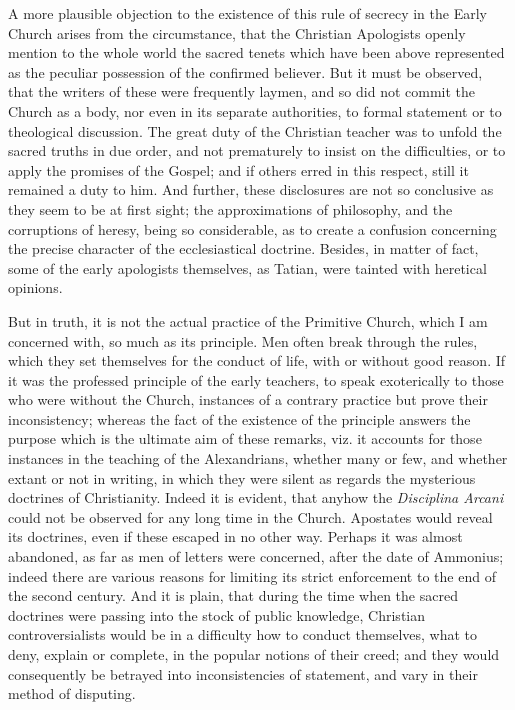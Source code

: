 A more plausible objection to the existence of this rule of secrecy
in the Early Church arises from the circumstance, that the Christian
Apologists openly mention to the whole world the sacred tenets which
have been above represented as the peculiar possession of the
confirmed believer. But it must be observed, that the writers of these
were frequently laymen, and so did not commit the Church as a body,
nor even in its separate authorities, to formal statement or to
theological discussion. The great duty of the Christian teacher was to
unfold the sacred truths in due order, and not prematurely to insist
on the difficulties, or to apply the promises of the Gospel; and if
others erred in this respect, still it remained a duty to him. And further, these disclosures are not so conclusive as they seem to
be at first sight; the approximations of philosophy, and the
corruptions of heresy, being so considerable, as to create a confusion
concerning the precise character of the ecclesiastical doctrine.
Besides, in matter of fact, some of the early apologists themselves,
as Tatian, were tainted with heretical opinions.

But in truth, it is not the actual practice of the Primitive
Church, which I am concerned with, so much as its principle. Men often
break through the rules, which they set themselves for the conduct of
life, with or without good reason. If it was the professed principle
of the early teachers, to speak exoterically to those who were without
the Church, instances of a contrary practice but prove their
inconsistency; whereas the fact of the existence of the principle
answers the purpose which is the ultimate aim of these remarks, viz.
it accounts for those instances in the teaching of the Alexandrians,
whether many or few, and whether extant or not in writing, in which
they were silent as regards the mysterious doctrines of Christianity.
Indeed it is evident, that anyhow the \emph{Disciplina Arcani} could
not be observed for any long time in the Church. Apostates would
reveal its doctrines, even if these escaped in no other way. Perhaps
it was almost abandoned, as far as men of letters were concerned,
after the date of Ammonius; indeed there are various reasons for
limiting its strict enforcement to the end of the second century. And
it is plain, that during the time when the sacred doctrines were
passing into the stock of public knowledge, Christian
controversialists would be in a difficulty how to conduct themselves,
what to deny, explain or complete, in the popular notions of
their creed; and they would consequently be betrayed into
inconsistencies of statement, and vary in their method of disputing.

